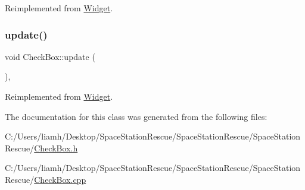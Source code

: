 Reimplemented from \mbox{\hyperlink{class_widget_a038576de7f1adf6b29f3ebfd3515f13f}{Widget}}.

\mbox{\label{class_check_box_a02e3ede9dd393fd232f1655205a3c51a}} 
\subsubsection{\texorpdfstring{update()}{update()}}
{\footnotesize\ttfamily void Check\+Box\+::update (\begin{DoxyParamCaption}{ }\end{DoxyParamCaption})\hspace{0.3cm}{\ttfamily [override]}, {\ttfamily [virtual]}}



Reimplemented from \mbox{\hyperlink{class_widget_a38aacc92bda1a1e91052873a4a955487}{Widget}}.



The documentation for this class was generated from the following files\+:\begin{DoxyCompactItemize}
\item 
C\+:/\+Users/liamh/\+Desktop/\+Space\+Station\+Rescue/\+Space\+Station\+Rescue/\+Space\+Station\+Rescue/\mbox{\hyperlink{_check_box_8h}{Check\+Box.\+h}}\item 
C\+:/\+Users/liamh/\+Desktop/\+Space\+Station\+Rescue/\+Space\+Station\+Rescue/\+Space\+Station\+Rescue/\mbox{\hyperlink{_check_box_8cpp}{Check\+Box.\+cpp}}\end{DoxyCompactItemize}
